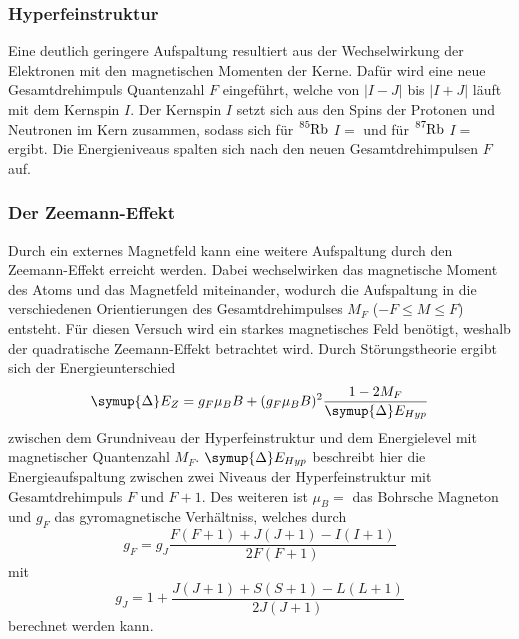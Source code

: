 \subsubsection{Hyperfeinstruktur}
Eine deutlich geringere Aufspaltung resultiert aus der Wechselwirkung der Elektronen mit den magnetischen Momenten der Kerne.
Dafür wird eine neue Gesamtdrehimpuls Quantenzahl $F$ eingeführt, welche von $|I - J|$ bis $|I + J|$ läuft mit dem Kernspin $I$.
Der Kernspin $I$ setzt sich aus den Spins der Protonen und Neutronen im Kern zusammen, sodass sich für $\ce{^{85}Rb}$ $I = $  und für $\ce{^{87}Rb}$
$I = $ ergibt. Die Energieniveaus spalten sich nach den neuen Gesamtdrehimpulsen $F$ auf. 

\subsubsection{Der Zeemann-Effekt}
Durch ein externes Magnetfeld kann eine weitere Aufspaltung durch den Zeemann-Effekt erreicht werden.
Dabei wechselwirken das magnetische Moment des Atoms und das Magnetfeld miteinander, wodurch die Aufspaltung in die
verschiedenen Orientierungen des Gesamtdrehimpulses $M_F$ ($-F \leq M \leq F$) entsteht. Für diesen Versuch wird ein starkes magnetisches Feld benötigt,
weshalb der quadratische Zeemann-Effekt betrachtet wird.
Durch Störungstheorie ergibt sich der Energieunterschied
\begin{equation}
    \symup{\Delta} E_Z = g_F \mu_B B + (g_F \mu_B B)^2 \frac{1-2M_F}{\symup{\Delta} E_{Hyp}}
\end{equation}
zwischen dem Grundniveau der Hyperfeinstruktur und dem Energielevel mit magnetischer Quantenzahl $M_F$. 
$\symup{\Delta} E_{Hyp}$ beschreibt hier die Energieaufspaltung zwischen zwei Niveaus der Hyperfeinstruktur mit Gesamtdrehimpuls $F$ und $F+1$.
Des weiteren ist $\mu_B = $ das Bohrsche Magneton und $g_F$ das gyromagnetische Verhältniss, welches durch
\begin{equation}
    g_F = g_J \frac{F(F+1)+J(J+1)-I(I+1)}{2F(F+1)}
    \label{eqn:aa}
\end{equation}
mit
\begin{equation}
    g_J = 1 + \frac{J(J+1)+S(S+1)-L(L+1)}{2J(J+1)}
    \label{eqn:bb}
\end{equation}
berechnet werden kann.\cite{dem}

